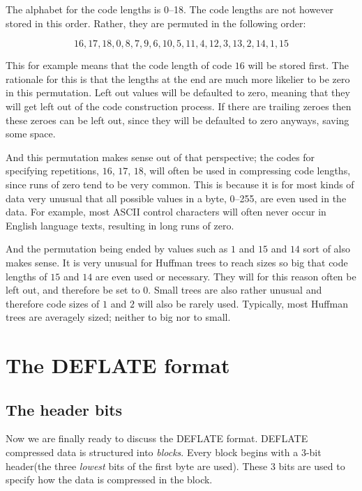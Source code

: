 The alphabet for the code lengths is 0--18. The code lengths are not
however stored in this order. Rather, they are permuted in the
following order:

\begin{equation*}
  16, 17, 18, 0, 8, 7, 9, 6, 10, 5, 11, 4, 12, 3, 13, 2, 14, 1, 15
\end{equation*}

This for example means that the code length of code $16$ will be
stored first. The rationale for this is that the lengths at the end
are much more likelier to be zero in this permutation. Left out values
will be defaulted to zero, meaning that they will get left out of the
code construction process. If there are trailing zeroes then these
zeroes can be left out, since they will be defaulted to zero anyways,
saving some space.

And this permutation makes sense out of that perspective; the codes
for specifying repetitions, $16$, $17$, $18$, will often be used in
compressing code lengths, since runs of zero tend to be very
common. This is because it is for most kinds of data very unusual that
all possible values in a byte, 0--255, are even used in the data. For
example, most ASCII control characters will often never occur in
English language texts, resulting in long runs of zero.

And the permutation being ended by values such as $1$ and $15$ and
$14$ sort of also makes sense. It is very unusual for Huffman trees to
reach sizes so big that code lengths of $15$ and $14$ are even used or
necessary. They will for this reason often be left out, and therefore
be set to $0$. Small trees are also rather unusual and therefore code
sizes of $1$ and $2$ will also be rarely used. Typically, most Huffman
trees are averagely sized; neither to big nor to small.

\section{The DEFLATE format}

\subsection{The header bits}

Now we are finally ready to discuss the DEFLATE format. DEFLATE
compressed data is structured into \textit{blocks}. Every block begins
with a 3-bit header(the three \textit{lowest} bits of the first byte
are used). These 3 bits are used to specify how the data is compressed
in the block.

